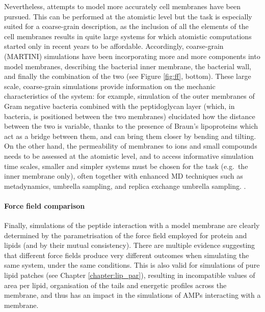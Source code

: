 Nevertheless, attempts to model more accurately cell membranes have been pursued. This can be performed at the atomistic level \cite{Piggot2011}
but the task is especially suited for a coarse-grain description, as the inclusion of all the elements of the cell membranes results in quite large systems for which atomistic computations started only in recent years to be affordable.
%
Accordingly, coarse-grain (MARTINI) simulations have been incorporating more and more components into model membranes, describing the bacterial inner membrane, the bacterial wall, and finally the combination of the two \cite{Khalid2019} (see Figure \ref{fig:ff}, bottom).
%
These large scale, coarse-grain simulations provide information on the mechanic characteristics of the system: for example, simulation of the outer membranes of Gram negative bacteria combined with the peptidoglycan layer (which, in bacteria, is positioned between the two membranes) elucidated how the distance between the two is variable, thanks to the presence of Braun's lipoproteins \cite{Asmar2018} which act as a bridge between them, and can bring them closer by bending and tilting.
%
On the other hand, the permeability of membranes to ions and small compounds needs to be assessed at the atomistic level, and to access informative simulation time scales, smaller and simpler systems must be chosen for the task (e.g.\ the inner membrane only), often together with enhanced MD techniques such as metadynamics, umbrella sampling, and replica exchange umbrella sampling. \cite{Sun2016,Piggot2011,Carpenter2016,Pokhrel2018}.

\paragraph{Force field comparison} Finally, simulations of the peptide interaction with a model membrane are clearly determined by the parametrisation of the force field employed for protein and lipids (and by their mutual consistency).
%
There are multiple evidence suggesting that different force fields produce very different outcomes when simulating the same system, under the same conditions. This is also valid for simulations of pure lipid patches (see Chapter \ref{chapter:lip_par}), resulting in incompatible values of area per lipid, organisation of the tails and energetic profiles across the membrane, and thus has an impact in the simulations of AMPs interacting with a membrane.

